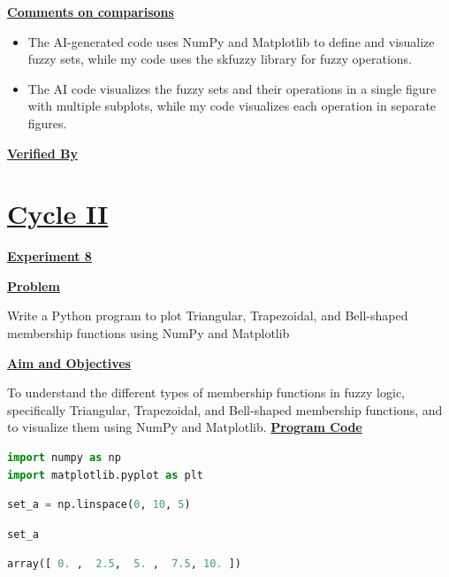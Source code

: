 \documentclass[a4paper,12pt]{article}
\begin{document}
\vspace{1em}
\noindent
\textbf{\underline{Comments on comparisons}}
\noindent
\begin{itemize}
    \item The AI-generated code uses NumPy and Matplotlib to define and visualize fuzzy sets, while my code uses the skfuzzy library for fuzzy operations.
    \item The AI code visualizes the fuzzy sets and their operations in a single figure with multiple subplots, while my code visualizes each operation in separate figures.
\end{itemize}
\vspace{1em}
\vfill
\noindent
\textbf{\underline{Verified By}}
\noindent
\vspace{3em}


\newpage

\section*{\underline{Cycle II}}
\begin{center}
\textbf{\underline{Experiment 8}}
\label{exp8}
\end{center}

\vspace{1em}
\noindent
\textbf{\underline{Problem}}\par
\noindent
Write a Python program to plot Triangular, Trapezoidal, and Bell-shaped membership functions using NumPy and Matplotlib


\vspace{1em}
\noindent
\textbf{\underline{Aim and Objectives}}\par
\noindent
To understand the different types of membership functions in fuzzy logic, specifically Triangular, Trapezoidal, and Bell-shaped membership functions, and to visualize them using NumPy and Matplotlib.
\vspace{1em}
\noindent
\textbf{\underline{Program Code}}
\noindent
\begin{lstlisting}[language=Python]
import numpy as np
import matplotlib.pyplot as plt
\end{lstlisting}

\begin{lstlisting}[language=Python]
set_a = np.linspace(0, 10, 5)
\end{lstlisting}

\begin{lstlisting}[language=Python]
set_a
\end{lstlisting}
\begin{lstlisting}[language=Python]
array([ 0. ,  2.5,  5. ,  7.5, 10. ])
\end{lstlisting}
\end{document}

